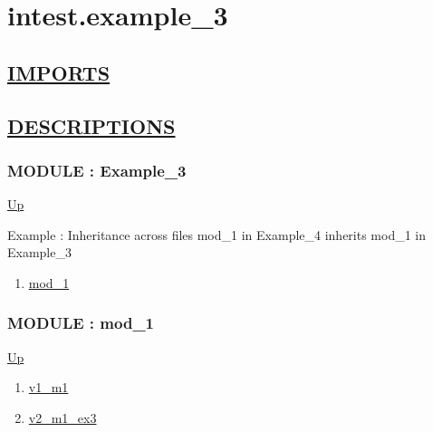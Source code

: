 \chapter*{intest.example\_3}
\hypertarget{ecldoc:toc:intest.example_3}{}

\section*{\underline{IMPORTS}}

\section*{\underline{DESCRIPTIONS}}
\subsection*{MODULE : Example\_3}
\hypertarget{ecldoc:intest.Example_3}{}
\par
\begin{minipage}[t]{\textwidth}
\begin{flushleft}
  
\end{flushleft}
\end{minipage}
\hyperlink{ecldoc:toc:intest}{Up} \\
\par
Example : Inheritance across files mod\_1 in Example\_4 inherits mod\_1 in Example\_3 \\
\par
\begin{enumerate}
\item \hyperlink{ecldoc:intest.Example_3.mod_1}{mod\_1}
\end{enumerate}
\subsection*{MODULE : mod\_1}
\hypertarget{ecldoc:intest.Example_3.mod_1}{}
\par
\begin{minipage}[t]{\textwidth}
\begin{flushleft}
  
\end{flushleft}
\end{minipage}
\hyperlink{ecldoc:intest.Example_3}{Up} \\
\par
\par
\begin{enumerate}
\item \hyperlink{ecldoc:intest.example_3.mod_1.v1_m1}{v1\_m1}
\item \hyperlink{ecldoc:intest.example_3.mod_1.v2_m1_ex3}{v2\_m1\_ex3}
\end{enumerate}
